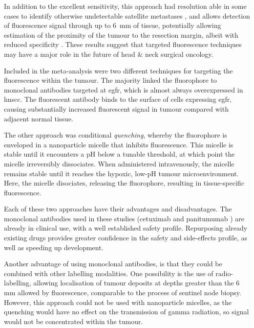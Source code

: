 In addition to the excellent sensitivity, this approach had resolution able in some cases to identify otherwise undetectable satellite metastases \cite{voskuilf.j.ImageguidedSurgeryTumor2019}, and allows detection of fluorescence signal through up to \SI{6}{\milli\metre} of tissue, potentially allowing estimation of the proximity of the tumour to the resection margin, albeit with reduced specificity \cite{vankeulenRapidNoninvasiveFluorescence2019}.
These results suggest that targeted fluorescence techniques may have a major role in the future of head \& neck surgical oncology.

Included in the meta-analysis were two different techniques for targeting the fluorescence within the tumour.
The majority linked the fluorophore to monoclonal antibodies  targeted at \gls{egfr}, which is almost always overexpressed in \gls{hnscc}\cite{chungIncreasedEpidermalGrowth2016}.
The fluorescent antibody binds to the surface of cells expressing \gls{egfr}, causing substantially increased fluorescent signal in tumour compared with adjacent normal tissue.

The other approach was conditional \textit{quenching}, whereby the fluorophore is enveloped in a nanoparticle micelle that inhibits fluorescence\cite{voskuilExploitingMetabolicAcidosis2020}.
This micelle is stable until it encounters a pH below a tunable threshold, at which point the micelle irreversibly dissociates. 
When administered intravenously, the micelle remains stable until it reaches the hypoxic, low-pH tumour microenvironment. 
Here, the micelle disociates, releasing the fluorophore, resulting in tissue-specific fluorescence.

Each of these two approaches have their advantages and disadvantages.
The monoclonal antibodies used in these studies (cetuximab \cite{warramFluorescenceImagingLocalize2016, voskuilf.j.FluorescenceguidedImagingResection2020}and panitumumab \cite{gaor.w.DeterminationTumorMargins2018, vankeulenRapidNoninvasiveFluorescence2019}) are already in clinical use, with a well established safety profile.
Repurposing already existing drugs provides greater confidence in the safety and side-effects profile, as well as speeding up development. 

Another advantage of using monoclonal antibodies, is that they could be combined with other labelling modalities.
One possibility is the use of radio-labelling, allowing localisation of tumour deposits at depths greater than the 6 mm allowed by fluorescence, comparable to the process of sentinel node biopsy.
However, this approach could not be used with nanoparticle micelles, as the quenching would have no effect on the transmission of gamma radiation, so signal would not be concentrated within the tumour.

